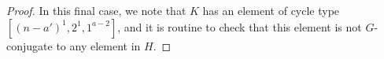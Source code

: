 \documentclass[twoside,a4paper,reqno,11pt]{amsart}
\newcommand{\<}{\langle}
\renewcommand{\>}{\rangle}
\def\Sym{\mathrm{Sym}}
\theoremstyle{definition}
\begin{document}
\begin{proof}
		In this final case, we note that $K$ has an element of cycle type $[(n-a')^1,2^1, 1^{a-2}]$, and it is routine to check that this element is not $G$-conjugate to any element in $H$.
	\end{proof}
	
\end{document}
